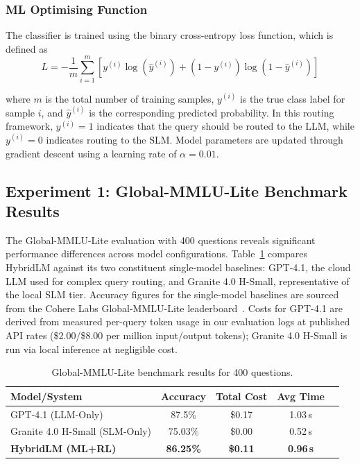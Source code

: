 \subsubsection{ML Optimising Function}
The classifier is trained using the binary cross-entropy loss function, which is defined as
\begin{equation}
L = -\frac{1}{m} \sum_{i=1}^{m} \left[ y^{(i)} \log \left( \hat{y}^{(i)} \right) + \left(1 - y^{(i)}\right) \log \left(1 - \hat{y}^{(i)}\right) \right]
\label{eq:bce_loss}
\end{equation}

where $m$ is the total number of training samples, $y^{(i)}$ is the true class label for sample $i$, and $\hat{y}^{(i)}$ is the corresponding predicted probability. In this routing framework, $y^{(i)} = 1$ indicates that the query should be routed to the LLM, while $y^{(i)} = 0$ indicates routing to the SLM. Model parameters are updated through gradient descent using a learning rate of $\alpha = 0.01$.

\subsection{Experiment 1: Global-MMLU-Lite Benchmark Results}
The Global-MMLU-Lite evaluation with 400 questions reveals significant performance differences across model configurations. Table~\ref{tab:mmlu_lite_results} compares HybridLM against its two constituent single-model baselines: GPT-4.1, the cloud LLM used for complex query routing, and Granite 4.0 H-Small, representative of the local SLM tier. Accuracy figures for the single-model baselines are sourced from the Cohere Labs Global-MMLU-Lite leaderboard~\cite{cohere2025globalmmlu}. Costs for GPT-4.1 are derived from measured per-query token usage in our evaluation logs at published API rates (\$2.00/\$8.00 per million input/output tokens); Granite 4.0 H-Small is run via local inference at negligible cost.

\begin{table}[t]
\centering
\caption{Global-MMLU-Lite benchmark results for 400 questions.}
\label{tab:mmlu_lite_results}
\begin{tabular}{lcccc}
\hline
\textbf{Model/System} & \textbf{Accuracy} & \textbf{Total Cost} & \textbf{Avg Time} \\
\hline
GPT-4.1 (LLM-Only)\cite{cohere2024globalmmlu}             & 87.5\% & \$0.17 & 1.03\,s \\
Granite 4.0 H-Small (SLM-Only)\cite{cohere2024globalmmlu}         & 75.03\% & \$0.00 & 0.52\,s \\
\textbf{HybridLM (ML+RL)}      & \textbf{86.25\%} & \textbf{\$0.11} & \textbf{0.96\,s} \\
\hline
\end{tabular}
\end{table}

